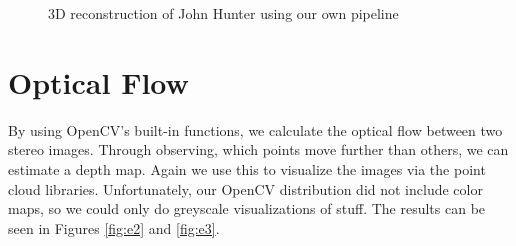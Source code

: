 \documentclass[11pt,a4paper]{article}
\begin{document}
\begin{figure}
\quad
\caption{3D reconstruction of John Hunter using our own pipeline}%
\label{fig:e1}%
\end{figure}

\section{Optical Flow}

By using OpenCV's built-in functions, we calculate the optical flow between two stereo images. Through observing, which points move further than others, we can estimate a depth map. Again we use this to visualize the images via the point cloud libraries. Unfortunately, our OpenCV distribution did not include color maps, so we could only do greyscale visualizations of stuff. The results can be seen in Figures \ref{fig:e2} and \ref{fig:e3}.
\end{document}
